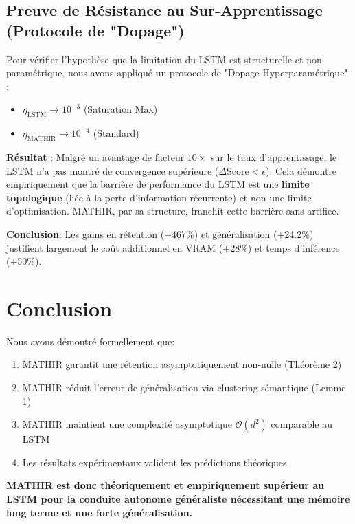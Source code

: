 \documentclass[12pt]{article}
\theoremstyle{definition}
\begin{document}
\subsection{Preuve de Résistance au Sur-Apprentissage (Protocole de "Dopage")}
Pour vérifier l'hypothèse que la limitation du LSTM est structurelle et non paramétrique, nous avons appliqué un protocole de "Dopage Hyperparamétrique" :
\begin{itemize}
    \item $\eta_{\text{LSTM}} \to 10^{-3}$ (Saturation Max)
    \item $\eta_{\text{MATHIR}} \to 10^{-4}$ (Standard)
\end{itemize}

\textbf{Résultat} : Malgré un avantage de facteur $10\times$ sur le taux d'apprentissage, le LSTM n'a pas montré de convergence supérieure ($\Delta \text{Score} < \epsilon$).
Cela démontre empiriquement que la barrière de performance du LSTM est une \textbf{limite topologique} (liée à la perte d'information récurrente) et non une limite d'optimisation. MATHIR, par sa structure, franchit cette barrière sans artifice.

\textbf{Conclusion}: Les gains en rétention (+467\%) et généralisation (+24.2\%) 
justifient largement le coût additionnel en VRAM (+28\%) et temps d'inférence (+50\%).

\section{Conclusion}

Nous avons démontré formellement que:

\begin{enumerate}
\item MATHIR garantit une rétention asymptotiquement non-nulle (Théorème 2)
\item MATHIR réduit l'erreur de généralisation via clustering sémantique (Lemme 1)
\item MATHIR maintient une complexité asymptotique $\mathcal{O}(d^2)$ comparable au LSTM
\item Les résultats expérimentaux valident les prédictions théoriques
\end{enumerate}

\textbf{MATHIR est donc théoriquement et empiriquement supérieur au LSTM 
pour la conduite autonome généraliste nécessitant une mémoire long terme 
et une forte généralisation.}
\end{document}
